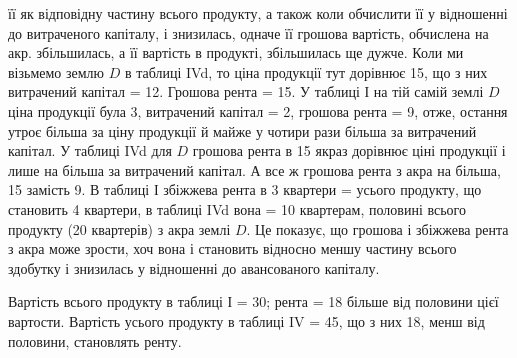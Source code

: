 її як відповідну частину всього продукту, а також коли обчислити її у відношенні
до витраченого капіталу, і знизилась, одначе її грошова вартість,
обчислена на акр. збільшилась, а її вартість в продукті, збільшилась ще дужче.
Коли ми візьмемо землю $D$ в таблиці IVd, то ціна продукції тут дорівнює
15, що з них витрачений капітал = 12. Грошова рента = 15. У таблиці І на тій самій землі $D$ ціна продукції була 3, витрачений
капітал = 2, грошова рента = 9, отже, остання
утроє більша за ціну продукції й майже у чотири рази більша за витрачений
капітал. У таблиці IVd для $D$ грошова рента в 15 якраз дорівнює ціні
продукції і лише на   більша за витрачений капітал. А все ж грошова рента
з акра на   більша, 15 замість 9. В таблиці І збіжжева
рента в 3 квартери =   усього продукту, що становить 4 квартери, в таблиці
IVd вона = 10 квартерам, половині всього продукту (20 квартерів) з акра
землі $D$. Це показує, що грошова і збіжжева рента з акра може зрости, хоч
вона і становить відносно меншу частину всього здобутку і знизилась у відношенні
до авансованого капіталу.

Вартість всього продукту в таблиці І = 30; рента = 18 більше від половини цієї вартости. Вартість усього продукту в таблиці
IV = 45, що з них 18, менш від половини, становлять
ренту.
